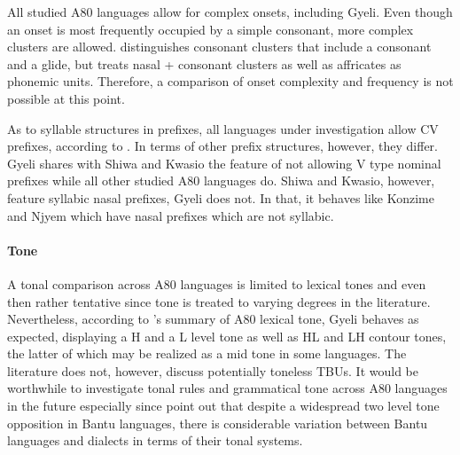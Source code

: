All studied A80 languages allow for complex onsets, including Gyeli. Even though an onset is most frequently occupied by a simple consonant, more complex clusters are allowed. \citet[319]{cheucle2014} distinguishes consonant clusters that include a consonant and a glide, but treats nasal + consonant clusters as well as affricates as phonemic units. Therefore, a comparison of onset complexity and frequency is not possible at this point.

As to syllable structures in prefixes, all languages under investigation allow CV prefixes, according to \citet[322]{cheucle2014}. In terms of other prefix structures, however, they differ. Gyeli shares with Shiwa and Kwasio the feature of not allowing V type nominal prefixes while all other studied A80 languages do. Shiwa and Kwasio, however, feature syllabic nasal prefixes, Gyeli does not. In that, it behaves like Konzime and Njyem which have nasal prefixes which are not syllabic.

\paragraph{Tone} A tonal comparison across A80 languages is limited to lexical tones and even then rather tentative since tone is treated to varying degrees in the literature. Nevertheless, according to \citet[350]{cheucle2014}'s summary of A80 lexical tone, Gyeli behaves as expected, displaying a H and a L level tone as well as HL and LH contour tones, the latter of which may be realized as a mid tone in some languages. The literature does not, however, discuss potentially toneless TBUs. It would be worthwhile to investigate tonal rules and grammatical tone across A80 languages in the future especially since \citet[59]{kisseberth2003} point out that despite a widespread two level tone opposition in Bantu languages, there is considerable variation between Bantu languages and dialects in terms of their tonal systems.

















